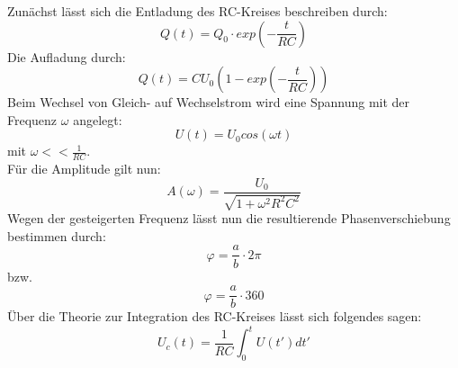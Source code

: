 Zunächst lässt sich die Entladung des RC-Kreises beschreiben durch:
\begin{equation} 
Q(t) = Q_0\cdot exp(-\frac{t}{RC})
\end{equation}
Die Aufladung durch:
\begin{equation} 
Q(t) = C U_0 (1 - exp(-\frac{t}{RC}))
\end{equation}
Beim Wechsel von Gleich- auf Wechselstrom wird eine Spannung mit der Frequenz $\omega$ angelegt:
\begin{equation} 
U(t) = U_0 cos(\omega t)
\end{equation}
mit $\omega << \frac{1}{RC}$. \\
Für die Amplitude gilt nun:
\begin{equation} 
A(\omega) = \frac{U_0}{\sqrt{1 + \omega ^2R^2C^2}}
\end{equation}
Wegen der gesteigerten Frequenz lässt nun die resultierende Phasenverschiebung bestimmen durch:
\begin{equation} 
\varphi = \frac{a}{b}\cdot 2\pi 
\end{equation}
bzw.
\begin{equation} 
\varphi = \frac{a}{b}\cdot 360 
\end{equation}
Über die Theorie zur Integration des RC-Kreises lässt sich folgendes sagen:
\begin{equation} 
U_c(t) = \frac{1}{RC}\int_{0}^{t} U(t') dt'
\end{equation}

